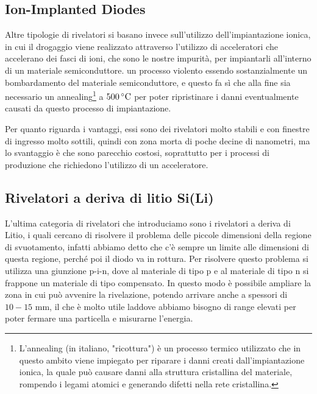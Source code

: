 \subsection{Ion-Implanted Diodes}
Altre tipologie di rivelatori si basano invece sull'utilizzo dell'impiantazione ionica, in cui il drogaggio viene realizzato attraverso l'utilizzo di acceleratori che accelerano dei fasci di ioni, che sono le nostre impurità, per impiantarli all'interno di un materiale semiconduttore. \E un processo violento essendo sostanzialmente un bombardamento del materiale semiconduttore, e questo fa sì che alla fine sia necessario un annealing\footnote{L'annealing (in italiano, "ricottura") è un processo termico utilizzato che in questo ambito viene impiegato per riparare i danni creati dall'impiantazione ionica, la quale può causare danni alla struttura cristallina del materiale, rompendo i legami atomici e generando difetti nella rete cristallina.} a $500 \, \rm ^{\circ}C$ per poter ripristinare i danni eventualmente causati da questo processo di impiantazione.

Per quanto riguarda i vantaggi, essi sono dei rivelatori molto stabili e con finestre di ingresso molto sottili, quindi con zona morta di poche decine di nanometri, ma lo svantaggio è che sono parecchio costosi, soprattutto per i processi di produzione che richiedono l'utilizzo di un acceleratore. 

\subsection{Rivelatori a deriva di litio Si(Li)}
L'ultima categoria di rivelatori che introduciamo sono i rivelatori a deriva di Litio, i quali cercano di risolvere il problema delle piccole dimensioni della regione di svuotamento, infatti abbiamo detto che c'è sempre un limite alle dimensioni di questa regione, perché poi il diodo va in rottura. Per risolvere questo problema si utilizza una giunzione p-i-n, dove al materiale di tipo p e al materiale di tipo n si frappone un materiale di tipo compensato. In questo modo è possibile ampliare la zona in cui può avvenire la rivelazione, potendo arrivare anche a spessori di $10-15$ mm, il che è molto utile laddove abbiamo bisogno di range elevati per poter fermare una particella e misurarne l'energia.

